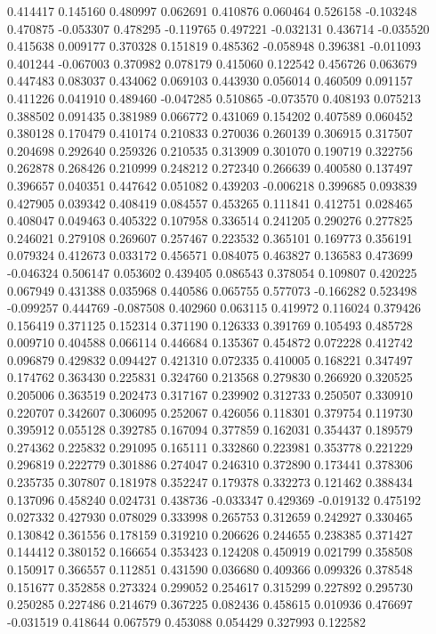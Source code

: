 0.414417
0.145160
0.480997
0.062691
0.410876
0.060464
0.526158
-0.103248
0.470875
-0.053307
0.478295
-0.119765
0.497221
-0.032131
0.436714
-0.035520
0.415638
0.009177
0.370328
0.151819
0.485362
-0.058948
0.396381
-0.011093
0.401244
-0.067003
0.370982
0.078179
0.415060
0.122542
0.456726
0.063679
0.447483
0.083037
0.434062
0.069103
0.443930
0.056014
0.460509
0.091157
0.411226
0.041910
0.489460
-0.047285
0.510865
-0.073570
0.408193
0.075213
0.388502
0.091435
0.381989
0.066772
0.431069
0.154202
0.407589
0.060452
0.380128
0.170479
0.410174
0.210833
0.270036
0.260139
0.306915
0.317507
0.204698
0.292640
0.259326
0.210535
0.313909
0.301070
0.190719
0.322756
0.262878
0.268426
0.210999
0.248212
0.272340
0.266639
0.400580
0.137497
0.396657
0.040351
0.447642
0.051082
0.439203
-0.006218
0.399685
0.093839
0.427905
0.039342
0.408419
0.084557
0.453265
0.111841
0.412751
0.028465
0.408047
0.049463
0.405322
0.107958
0.336514
0.241205
0.290276
0.277825
0.246021
0.279108
0.269607
0.257467
0.223532
0.365101
0.169773
0.356191
0.079324
0.412673
0.033172
0.456571
0.084075
0.463827
0.136583
0.473699
-0.046324
0.506147
0.053602
0.439405
0.086543
0.378054
0.109807
0.420225
0.067949
0.431388
0.035968
0.440586
0.065755
0.577073
-0.166282
0.523498
-0.099257
0.444769
-0.087508
0.402960
0.063115
0.419972
0.116024
0.379426
0.156419
0.371125
0.152314
0.371190
0.126333
0.391769
0.105493
0.485728
0.009710
0.404588
0.066114
0.446684
0.135367
0.454872
0.072228
0.412742
0.096879
0.429832
0.094427
0.421310
0.072335
0.410005
0.168221
0.347497
0.174762
0.363430
0.225831
0.324760
0.213568
0.279830
0.266920
0.320525
0.205006
0.363519
0.202473
0.317167
0.239902
0.312733
0.250507
0.330910
0.220707
0.342607
0.306095
0.252067
0.426056
0.118301
0.379754
0.119730
0.395912
0.055128
0.392785
0.167094
0.377859
0.162031
0.354437
0.189579
0.274362
0.225832
0.291095
0.165111
0.332860
0.223981
0.353778
0.221229
0.296819
0.222779
0.301886
0.274047
0.246310
0.372890
0.173441
0.378306
0.235735
0.307807
0.181978
0.352247
0.179378
0.332273
0.121462
0.388434
0.137096
0.458240
0.024731
0.438736
-0.033347
0.429369
-0.019132
0.475192
0.027332
0.427930
0.078029
0.333998
0.265753
0.312659
0.242927
0.330465
0.130842
0.361556
0.178159
0.319210
0.206626
0.244655
0.238385
0.371427
0.144412
0.380152
0.166654
0.353423
0.124208
0.450919
0.021799
0.358508
0.150917
0.366557
0.112851
0.431590
0.036680
0.409366
0.099326
0.378548
0.151677
0.352858
0.273324
0.299052
0.254617
0.315299
0.227892
0.295730
0.250285
0.227486
0.214679
0.367225
0.082436
0.458615
0.010936
0.476697
-0.031519
0.418644
0.067579
0.453088
0.054429
0.327993
0.122582
